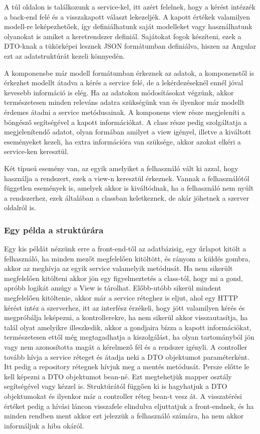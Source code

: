 A túl oldalon is találkozunk a service-kel, itt azért felelnek, hogy a kérést intézzék a back-end felé és a visszakapott választ lekezeljék. A kapott értékek valamilyen modell-re leképezhetőek, így definiálhatunk saját modelleket vagy használhatunk olyanokat is amiket a keretrendszer definiál. Sajátokat fogok készíteni, ezek a DTO-knak a tükörképei lesznek JSON formátumban definiálva, hiszen az Angular ezt az adatstruktúrát kezeli könnyedén. 

A komponensbe már modell formátumban érkeznek az adatok, a komponenstől is érkezhet modellt átadva a kérés a service felé, de a lekérdezéseknél ennél jóval kevesebb információ is elég. Ha az adatokon módosításokat végzünk, akkor természetesen minden releváns adatra szükségünk van és ilyenkor már modellt érdemes átadni a service metódusainak.
A komponens view része megjeleníti a böngésző segítségével a kapott információkat. A class része pedig szolgáltatja a megjelenítendő adatot, olyan formában amilyet a view igényel, illetve a kiváltott eseményeket kezeli, ha extra információra van szüksége, akkor azokat elkéri a service-ken keresztül.

Két típusú esemény van, az egyik amelyiket a felhasználó vált ki azzal, hogy használja a rendszert, ezek a view-n keresztül érkeznek. Vannak a felhasználótól független események is, amelyek akkor is kiváltódnak, ha a felhasználó nem nyúlt a rendszerhez, ezek általában a classban keletkeznek, de akár jöhetnek a  szerver oldalról is.

\subsubsection{Egy példa a struktúrára}

Egy kis példát nézzünk erre a front-end-től az adatbázisig, egy űrlapot kitölt a felhasználó, ha minden mezőt megfelelően kitöltött, és rányom a küldés gombra, akkor az meghívja az egyik service valamelyik metódusát. Ha nem sikerült megfelelően kitölteni akkor jön egy figyelmeztetés a class-tól, hogy mi a gond, apróbb logikát amúgy a View is tárolhat. Előbb-utóbb sikerül mindent megfelelően kitöltenie, akkor már a service réteghez is eljut, ahol egy HTTP kérést intéz a szerverhez, itt az interfész érzékeli, hogy jött valamilyen kérés és megpróbálja leképezni, a kontrollerekre, ha nem sikerül akkor visszautasítja, ha talál olyat amelyikre illeszkedik, akkor a gondjaira bízza a kapott információkat, természetesen ettől még megtagadhatja a kiszolgálást, ha olyan tartományból jön vagy nem azonosította magát a kérelmező fél és a rendszer igényli. A controller tovább hívja a service réteget és átadja neki a DTO objektumot paraméterként. Itt pedig a repository rétegnek hívjuk meg a mentés metódusát. Persze előtte le kell képezni a DTO objektumot bean-né. Ezt megtehetjük mapper osztály segítségével vagy kézzel is. Struktúrától függően ki is hagyhatjuk a DTO objektumokat és ilyenkor már a controller réteg bean-t vesz át. A visszatérési értéket pedig a hívási láncon visszafele elindulva eljuttatjuk a front-endnek, és ha minden rendben ment akkor ezt jelezzük a felhasználó számára, ha nem akkor informáljuk a hiba okáról.
 
